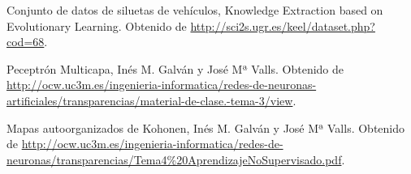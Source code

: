 \documentclass[11pt,spanish,listoffigures,listoftables]{workluis}
\begin{document}
\begin{thebibliography}{10}


   Conjunto de datos de siluetas de vehículos, 
   \newblock Knowledge Extraction based on Evolutionary Learning. 
   \newblock Obtenido de
   \url{http://sci2s.ugr.es/keel/dataset.php?cod=68}.

   Peceptrón Multicapa, 
   \newblock Inés M. Galván y José Mª Valls.
   \newblock Obtenido de
   \url{http://ocw.uc3m.es/ingenieria-informatica/redes-de-neuronas-artificiales/transparencias/material-de-clase.-tema-3/view}.

   Mapas autoorganizados de Kohonen, 
   \newblock Inés M. Galván y José Mª Valls.
   \newblock Obtenido de
   \url{http://ocw.uc3m.es/ingenieria-informatica/redes-de-neuronas/transparencias/Tema4%20AprendizajeNoSupervisado.pdf}.

   

\end{thebibliography}
\cleardoublepage

\end{document}
